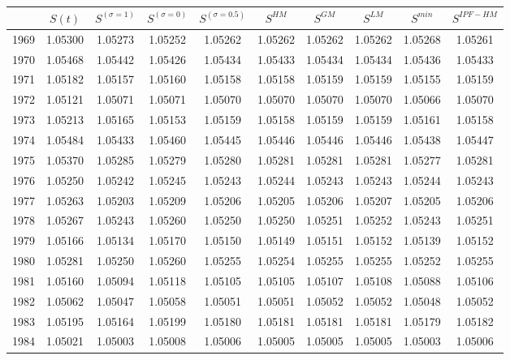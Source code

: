 \begin{tabular}{cccccccccc}
  \hline
 & $S(t)$ & $S^{(\sigma = 1)}$ & $S^{(\sigma = 0)}$ & $S^{(\sigma = 0.5)}$ & $S^{HM}$ & $S^{GM}$ & $S^{LM}$ & $S^{min}$ & $S^{IPF-HM}$ \\ 
  \hline
1969 & 1.05300 & 1.05273 & 1.05252 & 1.05262 & 1.05262 & 1.05262 & 1.05262 & 1.05268 & 1.05261 \\ 
  1970 & 1.05468 & 1.05442 & 1.05426 & 1.05434 & 1.05433 & 1.05434 & 1.05434 & 1.05436 & 1.05433 \\ 
  1971 & 1.05182 & 1.05157 & 1.05160 & 1.05158 & 1.05158 & 1.05159 & 1.05159 & 1.05155 & 1.05159 \\ 
  1972 & 1.05121 & 1.05071 & 1.05071 & 1.05070 & 1.05070 & 1.05070 & 1.05070 & 1.05066 & 1.05070 \\ 
  1973 & 1.05213 & 1.05165 & 1.05153 & 1.05159 & 1.05158 & 1.05159 & 1.05159 & 1.05161 & 1.05158 \\ 
  1974 & 1.05484 & 1.05433 & 1.05460 & 1.05445 & 1.05446 & 1.05446 & 1.05446 & 1.05438 & 1.05447 \\ 
  1975 & 1.05370 & 1.05285 & 1.05279 & 1.05280 & 1.05281 & 1.05281 & 1.05281 & 1.05277 & 1.05281 \\ 
  1976 & 1.05250 & 1.05242 & 1.05245 & 1.05243 & 1.05244 & 1.05243 & 1.05243 & 1.05244 & 1.05243 \\ 
  1977 & 1.05263 & 1.05203 & 1.05209 & 1.05206 & 1.05205 & 1.05206 & 1.05207 & 1.05205 & 1.05206 \\ 
  1978 & 1.05267 & 1.05243 & 1.05260 & 1.05250 & 1.05250 & 1.05251 & 1.05252 & 1.05243 & 1.05251 \\ 
  1979 & 1.05166 & 1.05134 & 1.05170 & 1.05150 & 1.05149 & 1.05151 & 1.05152 & 1.05139 & 1.05152 \\ 
  1980 & 1.05281 & 1.05250 & 1.05260 & 1.05255 & 1.05254 & 1.05255 & 1.05255 & 1.05252 & 1.05255 \\ 
  1981 & 1.05160 & 1.05094 & 1.05118 & 1.05105 & 1.05105 & 1.05107 & 1.05108 & 1.05088 & 1.05106 \\ 
  1982 & 1.05062 & 1.05047 & 1.05058 & 1.05051 & 1.05051 & 1.05052 & 1.05052 & 1.05048 & 1.05052 \\ 
  1983 & 1.05195 & 1.05164 & 1.05199 & 1.05180 & 1.05181 & 1.05181 & 1.05181 & 1.05179 & 1.05182 \\ 
  1984 & 1.05021 & 1.05003 & 1.05008 & 1.05006 & 1.05005 & 1.05005 & 1.05005 & 1.05003 & 1.05006 \\ 

\end{tabular}
